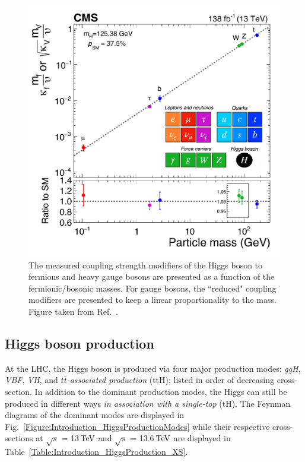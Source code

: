 \begin{figure}[h]
\centering
\includegraphics[width= .7\textwidth]{Figures/Introduction/CMS_Higgs_FermionCouplings.pdf}
\caption[Measured Higgs coupling modifiers versus fermion and boson masses]{The measured coupling strength modifiers of the Higgs boson to fermions and heavy gauge bosons are presented as a function of the fermionic/bosonic masses. For gauge bosons, the ``reduced" coupling modifiers are presented to keep a linear proportionality to the mass. Figure taken from Ref.~\cite{CMS_Couplings_Measurement}.}
\label{Figure:Introduction_CMScouplings}
\end{figure}

\subsection{Higgs boson production}

At the \ac{LHC}, the Higgs boson is produced via four major production modes: \textit{\ac{ggH}}, \textit{\ac{VBF}}, \textit{\ac{VH}}, and \textit{$t\overline{t}$-associated production} (ttH); listed in order of decreasing cross-section. In addition to the dominant production modes, the Higgs can still be produced in different ways \eg \textit{in association with a single-top} (tH). The Feynman diagrams of the dominant modes are displayed in Fig.~\ref{Figure:Introduction_HiggsProductionModes} while their respective cross-sections at $\sqrt{s}$ = 13$\,\text{Te\hspace{-.08em}V}$ and $\sqrt{s}$ = 13.6$\,\text{Te\hspace{-.08em}V}$ are displayed in Table~\ref{Table:Introduction_HiggsProduction_XS}. 


